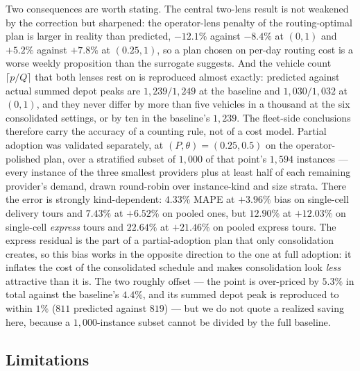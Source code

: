 \documentclass[preprint,12pt,authoryear]{elsarticle}
\begin{document}
Two consequences are worth stating. The central two-lens result is not weakened by the correction but sharpened: the operator-lens penalty of the routing-optimal plan is larger in reality than predicted, $-12.1\%$ against $-8.4\%$ at $(0, 1)$ and $+5.2\%$ against $+7.8\%$ at $(0.25, 1)$, so a plan chosen on per-day routing cost is a worse weekly proposition than the surrogate suggests. And the vehicle count $\lceil p/Q \rceil$ that both lenses rest on is reproduced almost exactly: predicted against actual summed depot peaks are $1{,}239/1{,}249$ at the baseline and $1{,}030/1{,}032$ at $(0, 1)$, and they never differ by more than five vehicles in a thousand at the six consolidated settings, or by ten in the baseline's $1{,}239$. The fleet-side conclusions therefore carry the accuracy of a counting rule, not of a cost model.
Partial adoption was validated separately, at $(P, \theta) = (0.25, 0.5)$ on the operator-polished plan, over a stratified subset of $1{,}000$ of that point's $1{,}594$ instances --- every instance of the three smallest providers plus at least half of each remaining provider's demand, drawn round-robin over instance-kind and size strata. There the error is strongly kind-dependent: $4.33\%$ MAPE at $+3.96\%$ bias on single-cell delivery tours and $7.43\%$ at $+6.52\%$ on pooled ones, but $12.90\%$ at $+12.03\%$ on single-cell \emph{express} tours and $22.64\%$ at $+21.46\%$ on pooled express tours. The express residual is the part of a partial-adoption plan that only consolidation creates, so this bias works in the opposite direction to the one at full adoption: it inflates the cost of the consolidated schedule and makes consolidation look \emph{less} attractive than it is. The two roughly offset --- the point is over-priced by $5.3\%$ in total against the baseline's $4.4\%$, and its summed depot peak is reproduced to within $1\%$ ($811$ predicted against $819$) --- but we do not quote a realized saving here, because a $1{,}000$-instance subset cannot be divided by the full baseline.

\subsection{Limitations}
\label{sec:limitations}
\end{document}
